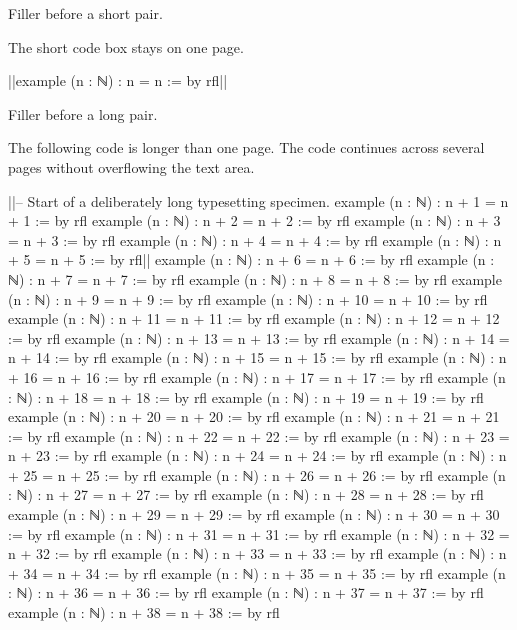 \documentclass{article}
\begin{document}
\noindent\rule{0pt}{95mm}
Filler before a short pair.
\label{before-short}
\par
The short code box stays on one page.
\label{short-prose}

\begin{lean}
  |\label{short-start}|example (n : ℕ) : n = n := by
    rfl|\label{short-end}|
\end{lean}

\clearpage
\noindent\rule{0pt}{70mm}
Filler before a long pair.
\label{before-long}
\par
The following code is longer than one page.
The code continues across several pages without overflowing the text area.
\label{long-prose}

\begin{lean}
  |\label{long-start}|-- Start of a deliberately long typesetting specimen.
  example (n : ℕ) : n + 1 = n + 1 := by rfl
  example (n : ℕ) : n + 2 = n + 2 := by rfl
  example (n : ℕ) : n + 3 = n + 3 := by rfl
  example (n : ℕ) : n + 4 = n + 4 := by rfl
  example (n : ℕ) : n + 5 = n + 5 := by rfl|\label{long-sixth}|
  example (n : ℕ) : n + 6 = n + 6 := by rfl
  example (n : ℕ) : n + 7 = n + 7 := by rfl
  example (n : ℕ) : n + 8 = n + 8 := by rfl
  example (n : ℕ) : n + 9 = n + 9 := by rfl
  example (n : ℕ) : n + 10 = n + 10 := by rfl
  example (n : ℕ) : n + 11 = n + 11 := by rfl
  example (n : ℕ) : n + 12 = n + 12 := by rfl
  example (n : ℕ) : n + 13 = n + 13 := by rfl
  example (n : ℕ) : n + 14 = n + 14 := by rfl
  example (n : ℕ) : n + 15 = n + 15 := by rfl
  example (n : ℕ) : n + 16 = n + 16 := by rfl
  example (n : ℕ) : n + 17 = n + 17 := by rfl
  example (n : ℕ) : n + 18 = n + 18 := by rfl
  example (n : ℕ) : n + 19 = n + 19 := by rfl
  example (n : ℕ) : n + 20 = n + 20 := by rfl
  example (n : ℕ) : n + 21 = n + 21 := by rfl
  example (n : ℕ) : n + 22 = n + 22 := by rfl
  example (n : ℕ) : n + 23 = n + 23 := by rfl
  example (n : ℕ) : n + 24 = n + 24 := by rfl
  example (n : ℕ) : n + 25 = n + 25 := by rfl
  example (n : ℕ) : n + 26 = n + 26 := by rfl
  example (n : ℕ) : n + 27 = n + 27 := by rfl
  example (n : ℕ) : n + 28 = n + 28 := by rfl
  example (n : ℕ) : n + 29 = n + 29 := by rfl
  example (n : ℕ) : n + 30 = n + 30 := by rfl
  example (n : ℕ) : n + 31 = n + 31 := by rfl
  example (n : ℕ) : n + 32 = n + 32 := by rfl
  example (n : ℕ) : n + 33 = n + 33 := by rfl
  example (n : ℕ) : n + 34 = n + 34 := by rfl
  example (n : ℕ) : n + 35 = n + 35 := by rfl
  example (n : ℕ) : n + 36 = n + 36 := by rfl
  example (n : ℕ) : n + 37 = n + 37 := by rfl
  example (n : ℕ) : n + 38 = n + 38 := by rfl

\end{lean}
\end{document}
